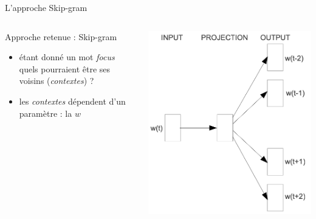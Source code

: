 \documentclass[10pt,xcolor=table,color={dvipsnames,usenames},ignorenonframetext,usepdftitle=false,french]{beamer}
\begin{document}
\begin{frame}{L'approche Skip-gram}
\protect\hypertarget{lapproche-skip-gram-1}{}

\begin{columns}
\begin{column}{0.6\textwidth}
Approche retenue : Skip-gram
\begin{itemize}
\item étant donné un mot \emph{focus} quels pourraient être ses voisins (\emph{contextes}) ?
\item les \emph{contextes} dépendent d'un paramètre : la  $w$
\end{itemize}
\medskip

\medskip {}
\end{column}
\begin{column}{0.4\textwidth} 
\includegraphics[width=\textwidth]{img/skip_gram.png}

\end{column}
\end{columns}

\end{frame}
\end{document}
